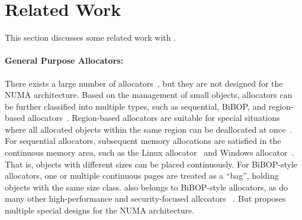 \section{Related Work}

\label{sec:related}

This section discusses some related work with \NM{}. 

\paragraph{General Purpose Allocators:}
 There exists a large number of allocators~\citep{dlmalloc,Hoard,tcmalloc,jemalloc,Scalloc}, but they are not designed for the NUMA architecture. Based on the management of small objects, allocators can be further classified into multiple types, such as sequential, BiBOP, and region-based allocators~\citep{Gay:1998:MME:277650.277748,  DieHarder}. Region-based allocators are suitable for special situations where all allocated objects within the same region can be deallocated at once~\citep{Gay:1998:MME:277650.277748}. For sequential allocators, subsequent memory allocations are satisfied in the continuous memory area, such as the Linux allocator~\citep{dlmalloc} and Windows allocator~\citep{DieHarder}. That is, objects with different sizes can be placed continuously. For BiBOP-style allocators, one or multiple continuous pages are treated as a ``bag'', holding objects with the same size class. \NM{} also belongs to BiBOP-style allocators, as do many other high-performance and security-focused allcoators ~\citep{tcmalloc, jemalloc, Hoard, Scalloc, DieHarder}. But \NM{}
  proposes multiple special designs for the NUMA architecture.
 

